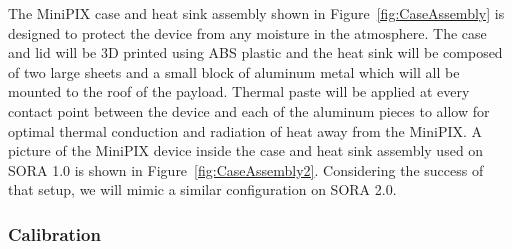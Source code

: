The MiniPIX case and heat sink assembly shown in Figure~\ref{fig:CaseAssembly} is designed to protect the device from any moisture in the atmosphere. The case and lid will be 3D printed using ABS plastic and the heat sink will be composed of two large sheets and a small block of aluminum metal which will all be mounted to the roof of the payload. Thermal paste will be applied at every contact point between the device and each of the aluminum pieces to allow for optimal thermal conduction and radiation of heat away from the MiniPIX. A picture of the MiniPIX device inside the case and heat sink assembly used on SORA 1.0 is shown in Figure~\ref{fig:CaseAssembly2}. Considering the success of that setup, we will mimic a similar configuration on SORA 2.0.

\subsubsection{Calibration}   
